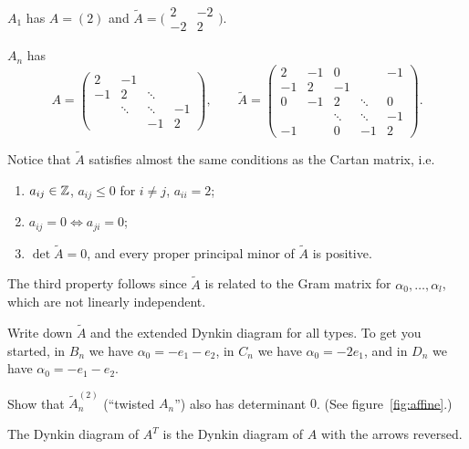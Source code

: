 \begin{example}
$A_1$ has $A = (2)$ and
$\tilde A = \bigl(\begin{smallmatrix} 2 & -2 \\ -2 & 2 \end{smallmatrix}\bigr)$.

$A_n$ has
\[
  A = \begin{pmatrix}
        2 & -1 & & \\
        -1 & 2 & \ddots & \\
        & \ddots & \ddots & -1\\
        & & -1 & 2
      \end{pmatrix}, \qquad
  \tilde A = \begin{pmatrix}
        2 & -1 & 0 & & -1\\
        -1 & 2 & -1 & & \\
        0 & -1 & 2 & \ddots & 0\\
        & & \ddots & \ddots & -1\\
        -1 & & 0 & -1 & 2
      \end{pmatrix}.
\]
\end{example}

Notice that $\tilde A$ satisfies almost the same conditions as the Cartan
matrix, i.e.
\begin{enumerate}
  \item $a_{ij} \in \mathbb{Z}$, $a_{ij} \leq 0$ for $i \neq j$, $a_{ii} = 2$;
  \item $a_{ij} = 0 \iff a_{ji} = 0$;
  \item $\det \tilde A = 0$, and every proper principal minor of $\tilde A$ is
    positive.
\end{enumerate}
The third property follows since $\tilde A$ is related to the Gram matrix for
$\alpha_0, \dots, \alpha_l$, which are not linearly independent.

\begin{exercise}
Write down $\tilde A$ and the extended Dynkin diagram for all types. To get you
started, in $B_n$ we have $\alpha_0 = -e_1 - e_2$, in $C_n$ we have
$\alpha_0 = -2e_1$, and in $D_n$ we have $\alpha_0 = -e_1 - e_2$.
\end{exercise}

\begin{exercise}
Show that $\tilde A_n^{(2)}$ (``twisted $A_n$'') also has determinant $0$. (See
figure~\ref{fig:affine}.)
\end{exercise}

\begin{exercise}
The Dynkin diagram of $A^T$ is the Dynkin diagram of $A$ with the arrows
reversed.
\end{exercise}

